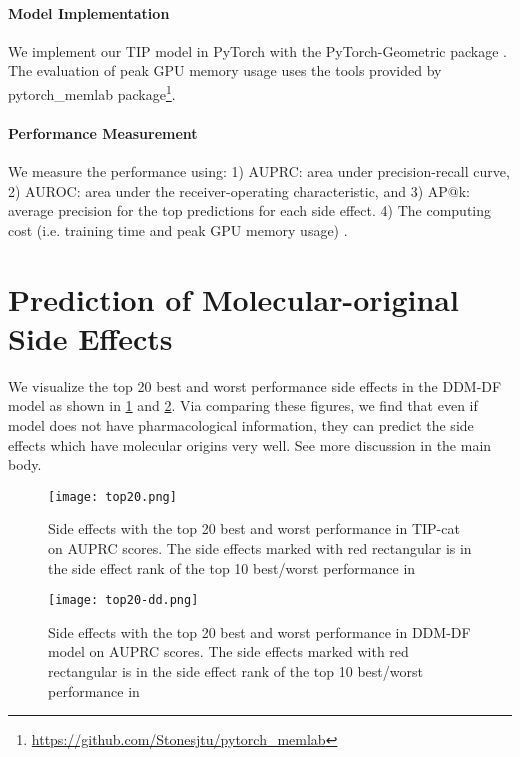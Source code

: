 \documentclass{article}
\begin{document}
\paragraph{Model Implementation} We implement our TIP model  in PyTorch \cite{torch} with the PyTorch-Geometric package \cite{pytorch}. The evaluation of peak GPU memory usage uses the tools provided by pytorch\_memlab package\footnote{\url{https://github.com/Stonesjtu/pytorch_memlab}}.

\paragraph{Performance Measurement} We measure the performance using: 1) AUPRC: area under precision-recall curve, 2) AUROC: area under the receiver-operating characteristic, and 3) AP@k: average precision for the top  predictions for each side effect. 4) The computing cost (i.e. training time and peak GPU memory usage) . 

\section{Prediction of Molecular-original Side Effects}
We visualize the top 20 best and worst performance side effects in the DDM-DF model as shown in \ref{fig:top20} and \ref{fig:top20-dd}. Via comparing these figures, we find that even if model does not have pharmacological information, they can predict the side effects which have molecular origins very well. See more discussion in the main body.

\begin{figure}[ht]
	\centering
	\texttt{[image: top20.png]}
	\caption{Side effects with the top 20 best and worst performance in TIP-cat on AUPRC scores. The side effects marked with red rectangular is in the side effect rank of the top 10 best/worst performance in \cite{decagon}}
	\label{fig:top20}
\end{figure}

\begin{figure}[ht]
	\centering
	\texttt{[image: top20-dd.png]}
	\caption{Side effects with the top 20 best and worst performance in DDM-DF model on AUPRC scores. The side effects marked with red rectangular is in the side effect rank of the top 10 best/worst performance in \cite{decagon}}
	\label{fig:top20-dd}
\end{figure}
\end{document}
